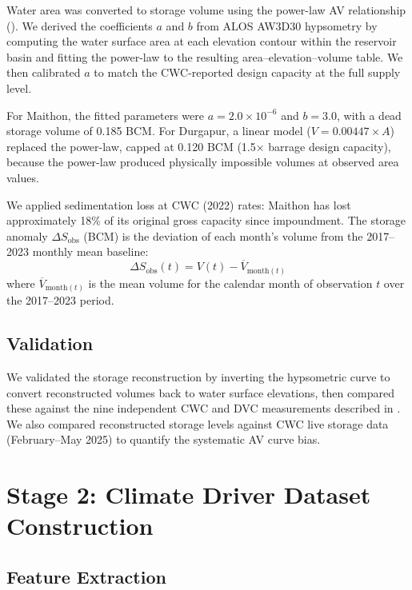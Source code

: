 \documentclass[12pt,a4paper,oneside]{report}
\newcommand{\dSobs}{\Delta S_{\mathrm{obs}}}
\begin{document}
Water area was converted to storage volume using the power-law AV
relationship (). We derived the coefficients $a$ and $b$
from ALOS AW3D30 hypsometry by computing the water surface area at each
elevation contour within the reservoir basin and fitting the power-law to the
resulting area--elevation--volume table. We then calibrated $a$ to match the
CWC-reported design capacity at the full supply level.

For Maithon, the fitted parameters were $a = 2.0 \times 10^{-6}$ and
$b = 3.0$, with a dead storage volume of 0.185 BCM. For Durgapur, a linear
model ($V = 0.00447 \times A$) replaced the power-law, capped at
0.120 BCM (1.5$\times$ barrage design capacity), because the power-law
produced physically impossible volumes at observed area values.

We applied sedimentation loss at CWC (2022) rates: Maithon has lost
approximately 18\% of its original gross capacity since impoundment. The
storage anomaly $\dSobs$ (BCM) is the deviation of each month's volume from
the 2017--2023 monthly mean baseline:
\begin{equation}
  \dSobs(t) = V(t) - \overline{V}_{\text{month}(t)}
  \label{eq:anomaly}
\end{equation}
where $\overline{V}_{\text{month}(t)}$ is the mean volume for the calendar
month of observation $t$ over the 2017--2023 period.

\subsection{Validation}
\label{sec:methods_validation}

We validated the storage reconstruction by inverting the hypsometric curve to
convert reconstructed volumes back to water surface elevations, then compared
these against the nine independent CWC and DVC measurements described in
. We also compared reconstructed storage levels against CWC
live storage data (February--May 2025) to quantify the systematic AV curve
bias.

\section{Stage 2: Climate Driver Dataset Construction}

\subsection{Feature Extraction}
\end{document}
